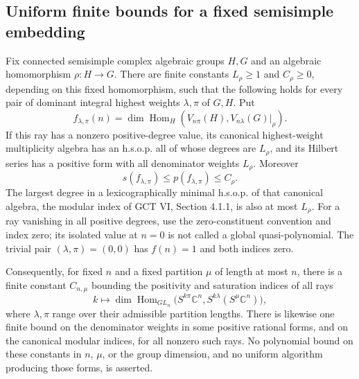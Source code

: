 \subsection{Uniform finite bounds for a fixed semisimple embedding}

\begin{proposition}
\label{prop:fixedplethysm}
Fix connected semisimple complex algebraic groups $H,G$ and an algebraic
homomorphism $\rho:H\to G$. There are finite constants $L_\rho\ge1$
and $C_\rho\ge0$, depending on this fixed homomorphism, such that the
following holds for every pair of dominant integral highest weights
$\lambda,\pi$ of $G,H$. Put
\[
 f_{\lambda,\pi}(n)
 =\dim\operatorname{Hom}_H
       (V_{n\pi}(H),V_{n\lambda}(G)|_\rho).
\]
If this ray has a nonzero positive-degree value, its canonical
highest-weight multiplicity algebra has an h.s.o.p. all of whose
degrees are $L_\rho$, and its Hilbert series has a positive form with
all denominator weights $L_\rho$. Moreover
\[
 s(f_{\lambda,\pi})\le p(f_{\lambda,\pi})\le C_\rho.
 \tag{P-F17a}
\]
The largest degree in a lexicographically minimal h.s.o.p. of that
canonical algebra, the modular index of GCT VI, Section 4.1.1,
is also at most $L_\rho$.
For a ray vanishing in all positive degrees, use the zero-constituent
convention and index zero; its isolated value at $n=0$ is not called
a global quasi-polynomial. The trivial pair $(\lambda,\pi)=(0,0)$
has $f(n)=1$ and both indices zero.

Consequently, for fixed $n$ and a fixed partition $\mu$ of length at
most $n$, there is a finite constant $C_{n,\mu}$ bounding the positivity
and saturation indices of all rays
\[
 k\longmapsto
 \dim\operatorname{Hom}_{GL_n}
 \bigl(S^{k\pi}\mathbb C^n,
       S^{k\lambda}(S^\mu\mathbb C^n)\bigr),
 \tag{P-F17b}
\]
where $\lambda,\pi$ range over their admissible partition lengths.
There is likewise one finite bound on the denominator weights in
some positive rational forms, and on the canonical modular indices,
for all nonzero such rays. No polynomial
bound on these constants in $n$, $\mu$, or the group dimension, and
no uniform algorithm producing those forms, is asserted.
\end{proposition}

